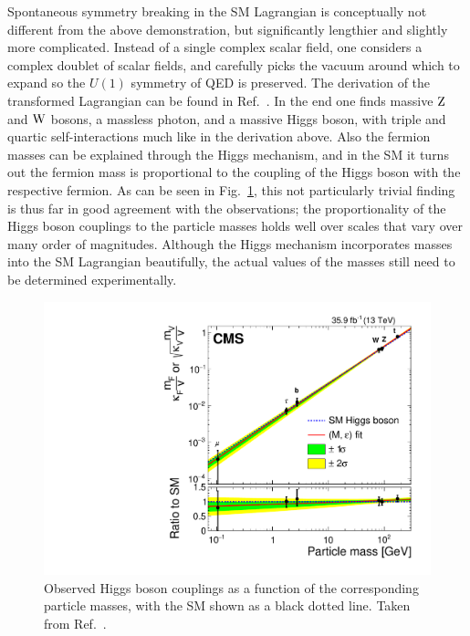 Spontaneous symmetry breaking in the SM Lagrangian is conceptually not different from the above demonstration, but significantly lengthier and slightly more complicated.
% 
Instead of a single complex scalar field, one considers a complex doublet of scalar fields, and carefully picks the vacuum around which to expand so the $U(1)$ symmetry of QED is preserved.
% 
The derivation of the transformed Lagrangian can be found in Ref.~\cite{Djouadi:2005gi}.
% 
In the end one finds massive $\mathrm{Z}$ and $\mathrm{W}$ bosons, a massless photon, and a massive Higgs boson, with triple and quartic self-interactions much like in the derivation above.
% 
Also the fermion masses can be explained through the Higgs mechanism, and in the SM it turns out the fermion mass is proportional to the coupling of the Higgs boson with the respective fermion.
% 
As can be seen in Fig.~\ref{fig:massproportion}, this not particularly trivial finding is thus far in good agreement with the observations; the proportionality of the Higgs boson couplings to the particle masses holds well over scales that vary over many order of magnitudes.
% 
Although the Higgs mechanism incorporates masses into the SM Lagrangian beautifully, the actual values of the masses still need to be determined experimentally.


\begin{figure}[hbtp]
  \begin{center}
    \includegraphics[width=\halflinewidth]{img/theory/grandcomb/massproportion.pdf}
    \caption{
        Observed Higgs boson couplings as a function of the corresponding particle masses, with the SM shown as a black dotted line.
        Taken from Ref.~\cite{Sirunyan:2018koj}.
        }
    \label{fig:massproportion}
  \end{center}
\end{figure}


